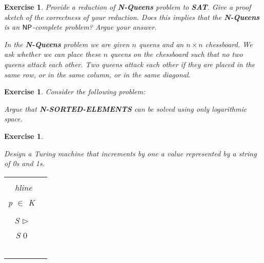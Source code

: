 \documentclass [11pt]{article}
\newtheorem{exercise}[theorem]{Exercise}
\newcommand{\ccfont}[1]{\protect\mathsf{#1}}
\newcommand{\NP}{\ccfont{NP}}
\newcommand{\solution}[1]{\noindent {\bf Solution.}  #1}
\begin{document}
\begin{exercise}
  \label{ex:Nqueens}
  Provide a reduction of \textbf{N-Queens} problem to \textbf{SAT}. Give a proof sketch of the correctness of your reduction. Does this implies that the \textbf{N-Queens} is an $\NP$-complete problem? Argue your answer.  
  
  \smallskip 
  
\noindent In the \textbf{N-Queens} problem we are given $n$ queens and an $n \times n$ chessboard. We ask whether we can place these $n$ queens on the  chessboard such that no two queens attack each other. Two queens attack each other if they are placed in the same row, or in the same column, or in the same diagonal.    
       
   
\end{exercise}




\begin{exercise}
  Consider the following problem:
  \begin{center}
  \end{center}

  \medskip Argue that \textbf{N-SORTED-ELEMENTS} can be solved using only logarithmic
  space.
\end{exercise}




\begin{exercise}
  \label{ex:turing}

  Design a Turing machine that increments by one a value represented by a string of 0s and 1s.
  
\bigskip  
  
\begin{tabular}{|c|c|}
\hline \\
\ hline\\ p $\in $ K &  \\ 
\hline  \\ 
 S  $\triangleright$ & \\ 
\hline  S  $0$ & \\ 
\hline  &  \\ 
\hline  &  \\ 
\hline  &  \\ 
\hline  &  \\ 
\hline  &  \\ 
\hline 
\end{tabular} 
\end{exercise}


\end{document}
